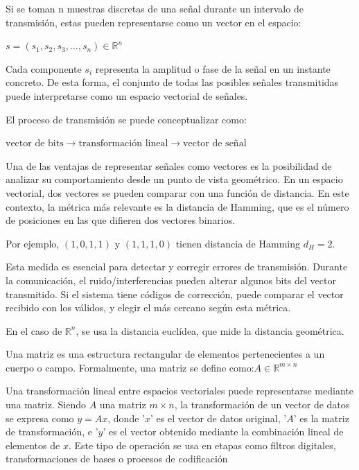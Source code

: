 \documentclass[letterpaper,12pt]{article}
\begin{document}
Si se toman n muestras discretas de una señal durante un intervalo de transmisión, estas pueden
representarse como un vector en el espacio:

\centerline{$s=(s_1,s_2,s_3,\ldots,s_n)\in\mathbb{R}^n$}

Cada componente $s_i$ representa la amplitud o fase de la señal en un instante concreto. De esta
forma, el conjunto de todas las posibles señales transmitidas puede interpretarse como un espacio
vectorial de señales.

El proceso de transmisión se puede conceptualizar como:

\centerline{$\text{vector de bits}\to\text{transformación lineal}\to\text{vector de señal}$}

Una de las ventajas de representar señales como vectores es la posibilidad de analizar su
comportamiento desde un punto de vista geométrico. En un espacio vectorial, dos vectores se
pueden comparar con una función de distancia. En este contexto, la métrica más relevante es la
distancia de Hamming, que es el número de posiciones en las que difieren dos vectores binarios.

Por ejemplo, $(1,0,1,1)$ y $(1,1,1,0)$ tienen distancia de Hamming $d_H=2$.

Esta medida es esencial para detectar y corregir errores de transmisión. Durante la comunicación,
el ruido/interferencias pueden alterar algunos bits del vector transmitido. Si el sistema tiene
códigos de corrección, puede comparar el vector recibido con los válidos, y elegir el más cercano
según esta métrica.

En el caso de $\mathbb{R}^n$, se usa la distancia euclídea, que mide la distancia geométrica.






\newpage
{}
Una matriz es una estructura rectangular de elementos pertenecientes a un cuerpo o campo.
Formalmente, una matriz se define como:$A\in\mathbb{R}^{m\times n}$

Una transformación lineal entre espacios vectoriales puede representarse mediante una matriz.
Siendo $A$ una matriz $m\times n$, la transformación de un vector de datos se expresa como $y = Ax$,
donde '$x$' es el vector de datos original, '$A$' es la matriz de transformación, e '$y$' es el vector
obtenido mediante la combinación lineal de elementos de $x$. Este tipo de operación se usa en
etapas como filtros digitales, transformaciones de bases o procesos de codificación
\end{document}
